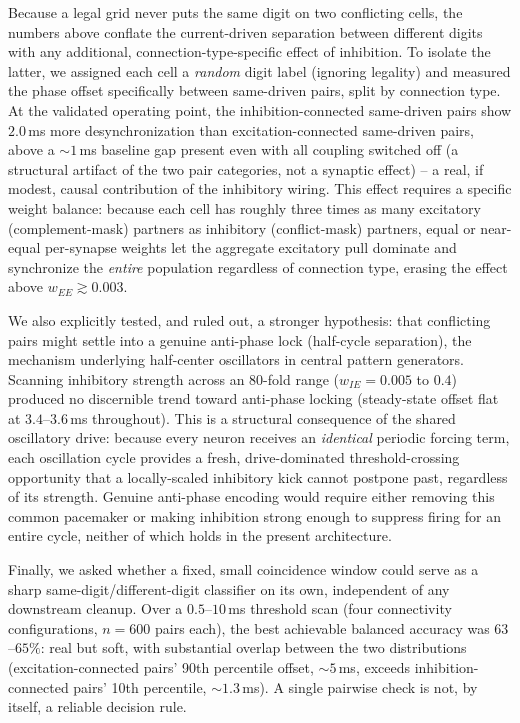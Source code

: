 \documentclass[11pt]{article}
\begin{document}
Because a legal grid never puts the same digit on two conflicting cells, the numbers above
conflate the current-driven separation between different digits with any additional,
connection-type-specific effect of inhibition. To isolate the latter, we assigned each cell
a \emph{random} digit label (ignoring legality) and measured the phase offset specifically
between same-driven pairs, split by connection type. At the validated operating point, the
inhibition-connected same-driven pairs show $2.0$\,ms more desynchronization than
excitation-connected same-driven pairs, above a $\sim1$\,ms baseline gap present even with
all coupling switched off (a structural artifact of the two pair categories, not a synaptic
effect) -- a real, if modest, causal contribution of the inhibitory wiring. This effect
requires a specific weight balance: because each cell has roughly three times as many
excitatory (complement-mask) partners as inhibitory (conflict-mask) partners, equal or
near-equal per-synapse weights let the aggregate excitatory pull dominate and synchronize the
\emph{entire} population regardless of connection type, erasing the effect above
$w_{EE}\gtrsim0.003$.

We also explicitly tested, and ruled out, a stronger hypothesis: that conflicting pairs
might settle into a genuine anti-phase lock (half-cycle separation), the mechanism underlying
half-center oscillators in central pattern generators. Scanning inhibitory strength across an
80-fold range ($w_{IE}=0.005$ to $0.4$) produced no discernible trend toward anti-phase
locking (steady-state offset flat at $3.4$--$3.6$\,ms throughout). This is a structural
consequence of the shared oscillatory drive: because every neuron receives an \emph{identical}
periodic forcing term, each oscillation cycle provides a fresh, drive-dominated
threshold-crossing opportunity that a locally-scaled inhibitory kick cannot postpone past,
regardless of its strength. Genuine anti-phase encoding would require either removing this
common pacemaker or making inhibition strong enough to suppress firing for an entire cycle,
neither of which holds in the present architecture.

Finally, we asked whether a fixed, small coincidence window could serve as a sharp
same-digit/different-digit classifier on its own, independent of any downstream cleanup. Over
a $0.5$--$10$\,ms threshold scan (four connectivity configurations, $n=600$ pairs each), the
best achievable balanced accuracy was $63$--$65\%$: real but soft, with substantial overlap
between the two distributions (excitation-connected pairs' 90th percentile offset,
${\sim}5$\,ms, exceeds inhibition-connected pairs' 10th percentile, ${\sim}1.3$\,ms). A
single pairwise check is not, by itself, a reliable decision rule.
\end{document}
